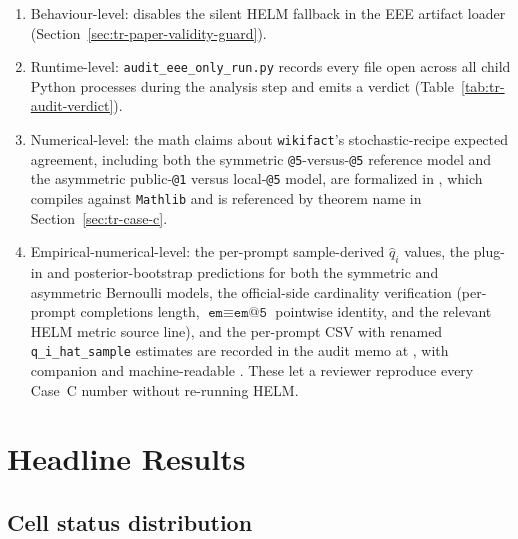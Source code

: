 \documentclass[11pt]{article}
\begin{document}
\begin{enumerate}
  \item Behaviour-level:  disables
        the silent HELM fallback in the EEE artifact loader
        (Section~\ref{sec:tr-paper-validity-guard}).
  \item Runtime-level: \texttt{audit\_eee\_only\_run.py} records every
        file open across all child Python processes during the
        analysis step and emits a verdict
        (Table~\ref{tab:tr-audit-verdict}).
  \item Numerical-level: the math claims about \texttt{wikifact}'s
        stochastic-recipe expected agreement, including both the
        symmetric \texttt{@5}-versus-\texttt{@5} reference model and
        the asymmetric public-\texttt{@1} versus local-\texttt{@5}
        model, are formalized in
        , which
        compiles against \texttt{Mathlib} and is referenced by
        theorem name in Section~\ref{sec:tr-case-c}.
  \item Empirical-numerical-level: the per-prompt sample-derived
        $\hat q_i$ values, the plug-in and posterior-bootstrap
        predictions for both the symmetric and asymmetric Bernoulli
        models, the official-side cardinality verification
        (per-prompt completions length, $\texttt{em} \equiv
        \texttt{em@5}$ pointwise identity, and the relevant HELM
        metric source line), and the per-prompt CSV with renamed
        \texttt{q\_i\_hat\_sample} estimates are recorded in the
        audit memo at
        ,
        with companion
         and machine-readable
        .
        These let a reviewer reproduce every Case~C number without
        re-running HELM.
\end{enumerate}

\section{Headline Results}
\label{sec:tr-headline}

\subsection{Cell status distribution}
\label{sec:tr-status-dist}
\end{document}
